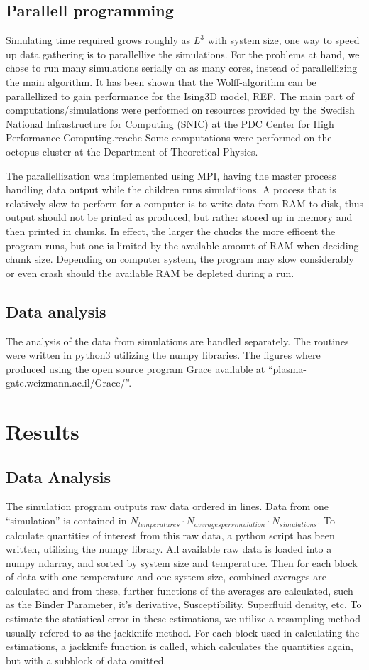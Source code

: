 \documentclass[a4paper]{article}
\begin{document}
\subsection{Parallell programming}
Simulating time required grows roughly as $L^3$ with system size, one way to speed up data gathering is to parallellize the simulations. For the problems at hand, we chose to run many simulations serially on as many cores, instead of parallellizing the main algorithm. It has been shown that the Wolff-algorithm can be parallellized to gain performance for the Ising3D model, REF. 
The main part of computations/simulations were performed on resources provided by the Swedish National Infrastructure for Computing (SNIC) at the PDC Center for High Performance Computing.reache
Some computations were performed on the octopus cluster at the Department of Theoretical Physics.

The parallellization was implemented using MPI, having the master process handling data output while the children runs simulatiions. A process that is relatively slow to perform for a computer is to write data from RAM to disk, thus output should not be printed as produced, but rather stored up in memory and then printed in chunks. In effect, the larger the chucks the more efficent the program runs, but one is limited by the available amount of RAM when deciding chunk size. Depending on computer system, the program may slow considerably or even crash should the available RAM be depleted during a run.
\subsection{Data analysis}
The analysis of the data from simulations are handled separately. The routines were written in python3 utilizing the numpy libraries. 
The figures where produced using the open source program Grace available at ``plasma-gate.weizmann.ac.il/Grace/''.

\section{Results}
\subsection{Data Analysis}
The simulation program outputs raw data ordered in lines. Data from one ``simulation'' is contained in $N_{temperatures} \cdot N_{averages per simulation} \cdot N_{simulations}$.
To calculate quantities of interest from this raw data, a python script has been written, utilizing the numpy library. All available raw data is loaded into a numpy ndarray, and sorted by system size and temperature. Then for each block of data with one temperature and one system size, combined averages are calculated and from these, further functions of the averages are calculated, such as the Binder Parameter, it's derivative, Susceptibility, Superfluid density, etc. To estimate the statistical error in these estimations, we utilize a resampling method usually refered to as the jackknife method. For each block used in calculating the estimations, a jackknife function is called, which calculates the quantities again, but with a subblock of data omitted.
\end{document}
